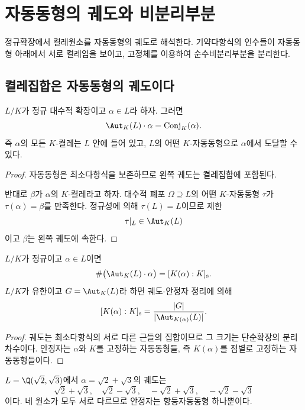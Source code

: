 \section{자동동형의 궤도와 비분리부분}
\label{sec:normal-orbits-inseparable}

\begin{learninggoal}
정규확장에서 켤레원소를 자동동형의 궤도로 해석한다. 기약다항식의 인수들이 자동동형 아래에서 서로 켤레임을 보이고, 고정체를 이용하여 순수비분리부분을 분리한다.
\end{learninggoal}

\subsection{켤레집합은 자동동형의 궤도이다}

\begin{theorem}
$L/K$가 정규 대수적 확장이고 $\alpha\in L$라 하자. 그러면
\[
  \Aut_K(L)\cdot\alpha
  =\operatorname{Conj}_K(\alpha).
\]
즉 $\alpha$의 모든 $K$-켤레는 $L$ 안에 들어 있고, $L$의 어떤 $K$-자동동형으로 $\alpha$에서 도달할 수 있다.
\end{theorem}

\begin{proof}
자동동형은 최소다항식을 보존하므로 왼쪽 궤도는 켤레집합에 포함된다.

반대로 $\beta$가 $\alpha$의 $K$-켤레라고 하자. 대수적 폐포 $\Omega\supseteq L$의 어떤 $K$-자동동형 $\tau$가 $\tau(\alpha)=\beta$를 만족한다. 정규성에 의해 $\tau(L)=L$이므로 제한
\[
  \tau|_L\in\Aut_K(L)
\]
이고 $\beta$는 왼쪽 궤도에 속한다.
\end{proof}

\begin{corollary}
$L/K$가 정규이고 $\alpha\in L$이면
\[
  \#\bigl(\Aut_K(L)\cdot\alpha\bigr)
  =[K(\alpha):K]_{\mathrm s}.
\]
$L/K$가 유한이고 $G=\Aut_K(L)$라 하면 궤도-안정자 정리에 의해
\[
  [K(\alpha):K]_{\mathrm s}
  =\frac{|G|}{|\Aut_{K(\alpha)}(L)|}.
\]
\end{corollary}

\begin{proof}
궤도는 최소다항식의 서로 다른 근들의 집합이므로 그 크기는 단순확장의 분리차수이다. 안정자는 $\alpha$와 $K$를 고정하는 자동동형들, 즉 $K(\alpha)$를 점별로 고정하는 자동동형들이다.
\end{proof}

\begin{example}
$L=\Q(\sqrt2,\sqrt3)$에서 $\alpha=\sqrt2+\sqrt3$의 궤도는
\[
  \sqrt2+\sqrt3,\quad
  \sqrt2-\sqrt3,\quad
  -\sqrt2+\sqrt3,\quad
  -\sqrt2-\sqrt3
\]
이다. 네 원소가 모두 서로 다르므로 안정자는 항등자동동형 하나뿐이다.
\end{example}

